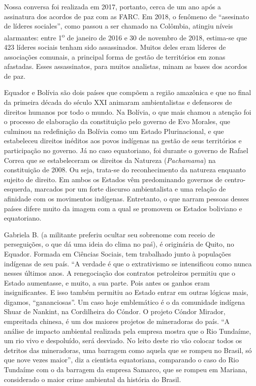 Nossa conversa foi realizada em 2017, portanto, cerca de um ano após a
assinatura dos acordos de paz com as FARC. Em 2018, o fenômeno de
``asesinato de líderes sociales'', como passou a ser chamado na
Colômbia, atingiu níveis alarmantes: entre 1\textsuperscript{o} de
janeiro de 2016 e 30 de novembro de 2018, estima-se que 423 líderes
sociais tenham sido assassinados. Muitos deles eram líderes de
associações comunais, a principal forma de gestão de territórios em
zonas afastadas. Esses assassinatos, para muitos analistas, minam as
bases dos acordos de paz.

Equador e Bolívia são dois países que compõem a região amazônica e que
no final da primeira década do século XXI animaram ambientalistas e
defensores de direitos humanos por todo o mundo. Na Bolívia, o que mais
chamou a atenção foi o processo de elaboração da constituição pelo
governo de Evo Morales, que culminou na redefinição da Bolívia como um
Estado Plurinacional, e que estabeleceu direitos inéditos aos povos
indígenas na gestão de seus territórios e participação no governo. Já no
caso equatoriano, foi durante o governo de Rafael Correa que se
estabeleceram os direitos da Natureza (\emph{Pachamama}) na constituição
de 2008. Ou seja, trata-se do reconhecimento da natureza enquanto
sujeito de direito. Em ambos os Estados vêm predominando governos de
centro-esquerda, marcados por um forte discurso ambientalista e uma
relação de afinidade com os movimentos indígenas. Entretanto, o que
narram pessoas desses países difere muito da imagem com a qual se
promovem os Estados boliviano e equatoriano.

Gabriela B. (a militante preferiu ocultar seu sobrenome com receio de
perseguições, o que dá uma ideia do clima no paś), é originária de
Quito, no Equador. Formada em Ciências Sociais, tem trabalhado junto à
populações indígenas de seu país. ``A verdade é que o extrativismo se
intensificou como nunca nesses últimos anos. A renegociação dos
contratos petroleiros permitiu que o Estado aumentasse, e muito, a sua
parte. Pois antes os ganhos eram insignificantes. E isso também permitiu
ao Estado entrar em outras lógicas mais, digamos, ``gananciosas''. Um
caso hoje emblemático é o da comunidade indígena Shuar de Nankint, na
Cordilheira do Cóndor. O projeto Cóndor Mirador, empreitada chinesa, é
um dos maiores projetos de mineradoras do país. ``A análise de impacto
ambiental realizada pela empresa mostra que o Rio Tundaíme, um rio vivo
e despoluído, será desviado. No leito deste rio vão colocar todos os
detritos das mineradoras, uma barragem como aquela que se rompeu no
Brasil, só que nove vezes maior'', diz a cientista equatoriana,
comparando o caso do Rio Tundaíme com o da barragem da empresa Samarco,
que se rompeu em Mariana, considerado o maior crime ambiental da
história do Brasil.

